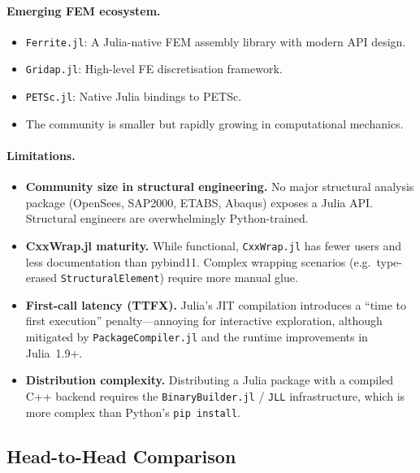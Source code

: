 \paragraph{Emerging FEM ecosystem.}
\begin{itemize}
  \item \texttt{Ferrite.jl}: A Julia-native FEM assembly library
        with modern API design.
  \item \texttt{Gridap.jl}: High-level FE discretisation framework.
  \item \texttt{PETSc.jl}: Native Julia bindings to PETSc.
  \item The community is smaller but rapidly growing in
        computational mechanics.
\end{itemize}

\paragraph{Limitations.}
\begin{itemize}
  \item \textbf{Community size in structural engineering.}
        No major structural analysis package (OpenSees, SAP2000,
        ETABS, Abaqus) exposes a Julia API.  Structural engineers
        are overwhelmingly Python-trained.
  \item \textbf{CxxWrap.jl maturity.}
        While functional, \texttt{CxxWrap.jl} has fewer users and
        less documentation than pybind11.  Complex wrapping scenarios
        (e.g.\ type-erased \texttt{StructuralElement}) require more
        manual glue.
  \item \textbf{First-call latency (TTFX).}
        Julia's JIT compilation introduces a ``time to first
        execution'' penalty---annoying for interactive exploration,
        although mitigated by \texttt{PackageCompiler.jl} and the
        runtime improvements in Julia~1.9+.
  \item \textbf{Distribution complexity.}
        Distributing a Julia package with a compiled C++ backend
        requires the \texttt{BinaryBuilder.jl} / \texttt{JLL}
        infrastructure, which is more complex than Python's
        \texttt{pip install}.
\end{itemize}

\subsection{Head-to-Head Comparison}
\label{sec:scripting-comparison}


